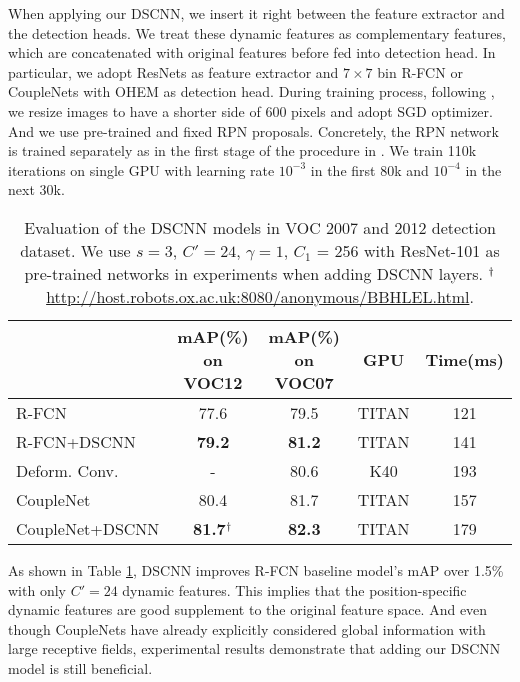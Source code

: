 \documentclass[runningheads]{llncs}
\begin{document}
When applying our DSCNN, we insert it right between the feature extractor and the detection heads. We treat these dynamic features as complementary features, which are concatenated with original features before fed into detection head.
In particular, we adopt ResNets as feature extractor and $7\times 7$ bin R-FCN \cite{dai2016r} or CoupleNets \cite{zhu2017couplenet} with OHEM \cite{shrivastava2016training} as detection head. During training process, following \cite{dai2017deformable}, we resize images to have a shorter side of 600 pixels and adopt SGD optimizer. And we use pre-trained and fixed RPN proposals. Concretely, the RPN network is trained separately as in the first stage of the procedure in \cite{ren2015faster}. We train 110k iterations on single GPU with learning rate $10^{-3}$ in the first 80k and $10^{-4}$ in the next 30k. 
\begin{table}[t]
\centering
\begin{tabular}{l|c|c|c|c}
\hline
                                        & mAP(\%) on VOC12  & mAP(\%) on VOC07  & GPU   &  Time(ms) \\\hline\hline
R-FCN \cite{dai2016r}                   & 77.6              & 79.5              & TITAN & 121              \\
R-FCN+DSCNN                             & \textbf{79.2}     &\textbf{81.2}      & TITAN & 141           \\\hline 
Deform. Conv. \cite{dai2017deformable}  & -                 & 80.6              & K40   & 193              \\
CoupleNet \cite{zhu2017couplenet}       & 80.4              & 81.7              & TITAN & 157              \\
CoupleNet+DSCNN                         & \textbf{81.7}$^\text{\dag}$   & \textbf{82.3}     & TITAN & 179          \\\hline 
\end{tabular}
\caption{Evaluation of the DSCNN models in VOC 2007 and 2012 detection dataset. We use $s=3$, $C'=24$, $\gamma = 1$, $C_1$ = 256 with ResNet-101 as pre-trained networks in experiments when adding DSCNN layers. $^\text{\dag}$\url{http://host.robots.ox.ac.uk:8080/anonymous/BBHLEL.html}.}
\label{eval_voc_det}
\end{table}

As shown in Table \ref{eval_voc_det}, DSCNN improves R-FCN baseline model's mAP over 1.5\% with only $C' = 24$ dynamic features. This implies that the position-specific dynamic features are good supplement to the original feature space. And even though CoupleNets \cite{zhu2017couplenet} have already explicitly considered global information with large receptive fields, experimental results demonstrate that adding our DSCNN model is still beneficial. \\
\end{document}
